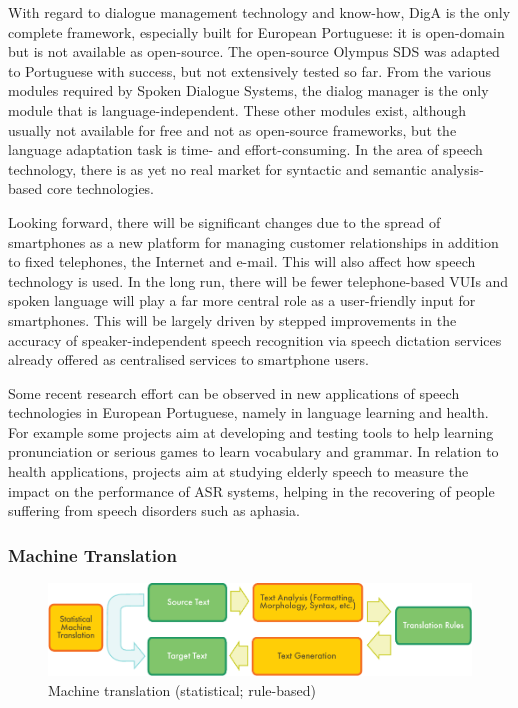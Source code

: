 \begin{multicols}{2}
    With regard to dialogue management technology and know-how, DigA is the only complete framework, especially built for European Portuguese: it is open-domain but is not available as open-source. The open-source Olympus SDS was adapted to Portuguese with success, but not extensively tested so far. From the various modules required by Spoken Dialogue Systems, the dialog manager is the only module that is language-independent. These other modules exist, although usually not available for free and not as open-source frameworks, but the language adaptation task is time- and effort-consuming. In the area of speech technology, there is as yet no real market for syntactic and semantic analysis-based core technologies.

   Looking forward, there will be significant changes due to the spread of smartphones as a new platform for managing customer relationships in addition to fixed telephones, the Internet and e-mail. This will also affect how speech technology is used. In the long run, there will be fewer telephone-based VUIs and spoken language will play a far more central role as a user-friendly input for smartphones. This will be largely driven by stepped improvements in the accuracy of speaker-independent speech recognition via speech dictation services already offered as centralised services to smartphone users. 

Some recent research effort can be observed in new applications of speech technologies in European Portuguese, namely in language learning and health. For example some projects aim at developing and testing tools to help learning pronunciation or serious games to learn vocabulary and grammar. In relation to health applications, projects aim at studying elderly speech to measure the impact on the performance of ASR systems, helping in the recovering of people suffering from speech disorders such as aphasia.

\subsubsection{Machine Translation}

\begin{figure}[htb]
  \center
  \includegraphics[width=\textwidth]{../_media/english/machine_translation}
  \caption{Machine translation (statistical; rule-based)}
  \label{fig:mtarch_en}
\end{figure}


\end{multicols}
